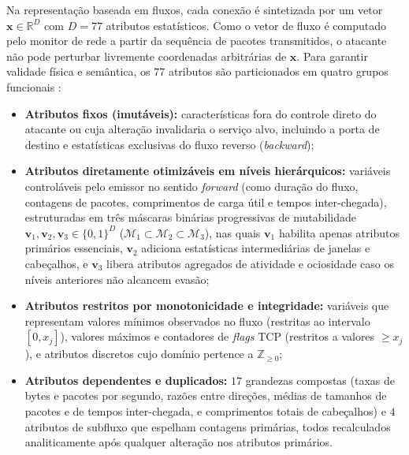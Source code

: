 \documentclass[conference]{IEEEtran}
\begin{document}
Na representação baseada em fluxos, cada conexão é sintetizada por um vetor $\mathbf{x} \in \mathbb{R}^{D}$ com $D = 77$ atributos estatísticos.
Como o vetor de fluxo é computado pelo monitor de rede a partir da sequência de pacotes transmitidos, o atacante não pode perturbar livremente coordenadas arbitrárias de $\mathbf{x}$.
Para garantir validade física e semântica, os $77$ atributos são particionados em quatro grupos funcionais \cite{hashemi2019, hashemi2020}:
\begin{itemize}
    \item \textbf{Atributos fixos (imutáveis):} características fora do controle direto do atacante ou cuja alteração invalidaria o serviço alvo, incluindo a porta de destino e estatísticas exclusivas do fluxo reverso (\textit{backward});
    \item \textbf{Atributos diretamente otimizáveis em níveis hierárquicos:} variáveis controláveis pelo emissor no sentido \textit{forward} (como duração do fluxo, contagens de pacotes, comprimentos de carga útil e tempos inter-chegada), estruturadas em três máscaras binárias progressivas de mutabilidade $\mathbf{v}_1, \mathbf{v}_2, \mathbf{v}_3 \in \{0, 1\}^{D}$ ($\mathcal{M}_1 \subset \mathcal{M}_2 \subset \mathcal{M}_3$), nas quais $\mathbf{v}_1$ habilita apenas atributos primários essenciais, $\mathbf{v}_2$ adiciona estatísticas intermediárias de janelas e cabeçalhos, e $\mathbf{v}_3$ libera atributos agregados de atividade e ociosidade caso os níveis anteriores não alcancem evasão;
    \item \textbf{Atributos restritos por monotonicidade e integridade:} variáveis que representam valores mínimos observados no fluxo (restritas ao intervalo $[0, x_j]$), valores máximos e contadores de \textit{flags} TCP (restritos a valores $\ge x_j$), e atributos discretos cujo domínio pertence a $\mathbb{Z}_{\ge 0}$;
    \item \textbf{Atributos dependentes e duplicados:} $17$ grandezas compostas (taxas de bytes e pacotes por segundo, razões entre direções, médias de tamanhos de pacotes e de tempos inter-chegada, e comprimentos totais de cabeçalhos) e $4$ atributos de subfluxo que espelham contagens primárias, todos recalculados analiticamente após qualquer alteração nos atributos primários.
\end{itemize}
\end{document}
